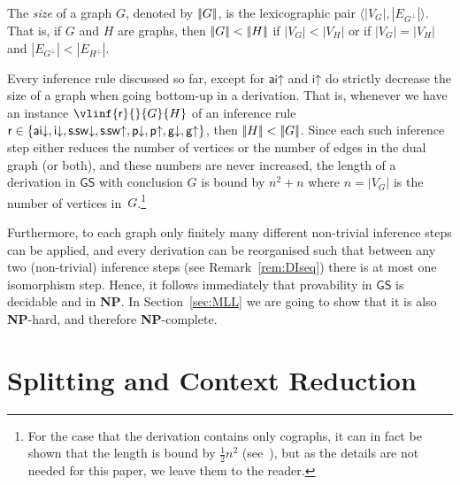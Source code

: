 \documentclass{lmcs} %
\def\GS{\mathsf{GS}}
\def\idr{\dirule}
\def\iur{\uirule}
\def\aidr{\dairule}
\def\aiur{\uairule}
\def\ssdr{\dssrule}
\def\ssur{\ussrule}
\def\pdr{\dprule}
\def\pur{\uprule}
\def\gdr{\dgrule}
\def\gur{\ugrule}
\def\rr{\mathsf{r}}
\def\set#1{\{#1\}}
\def\NP{{\bf NP}}
\def\tuple#1{\langle#1\rangle}
\def\cneg#1{{#1^\bot}}
\def\airule{\mathsf{ai}}
\def\dairule{\airule\mathord{\downarrow}}
\def\uairule{\airule\mathord{\uparrow}}
\def\irule{\mathsf{i}}
\def\dirule{\irule\mathord{\downarrow}}
\def\uirule{\irule\mathord{\uparrow}}
\def\grule{\mathsf{g}}
\def\dgrule{\grule\mathord{\downarrow}}
\def\ugrule{\grule\mathord{\uparrow}}
\def\ssrule{\mathsf{s\mkern-1mu.\mkern-1mu sw}}
\def\ussrule{\ssrule\mathord{\uparrow}}
\def\dssrule{\ssrule\mathord{\downarrow}}
\def\prule{\mathsf{p}}
\def\dprule{\prule\mathord{\downarrow}}
\def\uprule{\prule\mathord{\uparrow}}
\def\gG{G}
\def\gH{H}
\newcommand{\vertices}[1][]{V_{#1}}
\newcommand{\gEdges}[1][]{E_{#1}}
\newcommand{\vG}{\vertices[G]}
\newcommand{\enG}{\gEdges[\cneg G]}
\newcommand{\vH}{\vertices[H]}
\newcommand{\enH}{\gEdges[\cneg H]}
\newcommand{\sizeof}[1]{|#1|}
\def\gsize#1{|\mkern-2.75mu|#1|\mkern-2.75mu|}
\newcommand{\gless}[2]{\gsize{#1} < \gsize{#2}}
\theoremstyle{plain}
\begin{document}
\begin{defi}\label{def:size}
  The \emph{size} of a graph $\gG$, denoted by $\gsize{\gG}$, is the
  lexicographic pair $\tuple{\sizeof\vG,\sizeof\enG}$.  That is, if
  $\gG$ and $\gH$ are graphs, then $\gless{\gG}{\gH}$ if
  $\sizeof{\vG}<\sizeof{\vH}$ or if $\sizeof{\vG}=\sizeof{\vH}$ and
  $\sizeof{\enG}<\sizeof{\enH}$.
\end{defi}

\begin{obs}\label{obs:size}
Every
inference rule discussed so far, except for $\aiur$ and $\iur$ do
strictly decrease the size of a graph when going bottom-up in a
derivation. That is, whenever we have an instance
${\vlinf{\rr}{}{\gG}{\gH}}$ of an inference rule
$\rr\in\set{\aidr,\idr,\ssdr,\ssur,\pdr,\pur,\gdr,\gur}$, then
$\gless{\gH}{\gG}$.
Since each such inference step either reduces the number of vertices or the number of edges in the dual graph (or both), and these  numbers are  never increased, the length of a derivation in
$\GS$ with conclusion $\gG$ is bound by $n^2+n$ where $n=\sizeof\vG$ is
the number of vertices in~$\gG$.\footnote{For the case that the derivation contains only cographs, it can in fact be shown that the length
    is bound by $\frac12n^2$ (see~\cite{bru:str:swi-med}), but as the details
    are not needed for this paper, we leave them to the reader.}
\end{obs}

Furthermore, to each graph only finitely many different non-trivial inference steps can be applied, and every derivation can be reorganised such that between any two (non-trivial) inference steps (see Remark~\ref{rem:DIseq}) there is at most one isomorphism step.  
Hence, it follows immediately that provability in $\GS$ is decidable and in
{\bf NP}. In Section~\ref{sec:MLL} we are going to show that it is also \NP-hard, and therefore \NP-complete.



\section{Splitting and Context Reduction}\label{sec:splitting}
\end{document}

